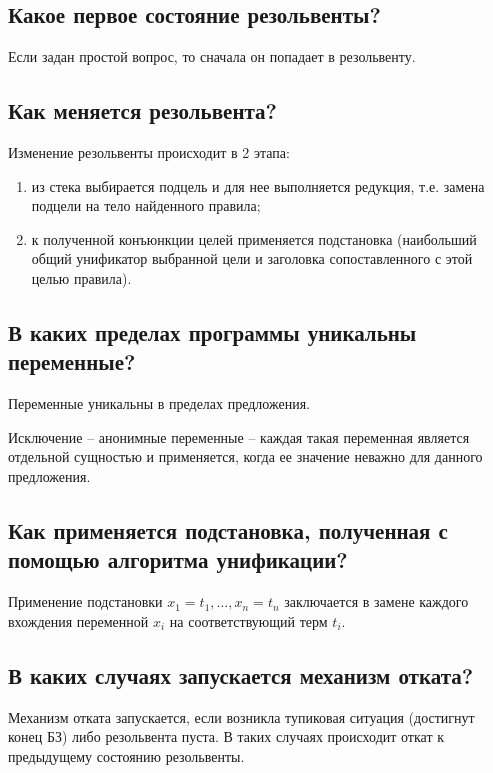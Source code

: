 \documentclass[a4paper,12pt]{article}
\begin{document}
	\subsection*{Какое первое состояние резольвенты?}
	
	Если задан простой вопрос, то сначала он попадает в резольвенту.
	
	\subsection*{Как меняется резольвента?}
	
	Изменение резольвенты происходит в 2 этапа:
	
	\begin{enumerate}
		\item из стека выбирается подцель и для нее выполняется редукция, т.е. замена подцели на тело найденного правила;
		\item к полученной конъюнкции целей применяется подстановка (наибольший общий унификатор выбранной цели и заголовка сопоставленного с этой целью правила).
	\end{enumerate}

	\subsection*{В каких пределах программы уникальны переменные? }
	
	Переменные уникальны в пределах предложения.
	
	 Исключение – анонимные переменные – каждая такая переменная является отдельной сущностью и применяется, когда ее значение неважно для данного предложения.
	
	\subsection*{Как применяется подстановка, полученная с помощью алгоритма унификации?}
	
	Применение подстановки ${x_1=t_1, …, x_n=t_n}$ заключается в замене каждого вхождения переменной $x_i$ на соответствующий терм $t_i$.
	
	\subsection*{В каких случаях запускается механизм отката?}
	
	Механизм отката запускается, если возникла тупиковая ситуация (достигнут конец БЗ) либо резольвента пуста. В таких случаях происходит откат к предыдущему состоянию резольвенты.
	
\end{document}

